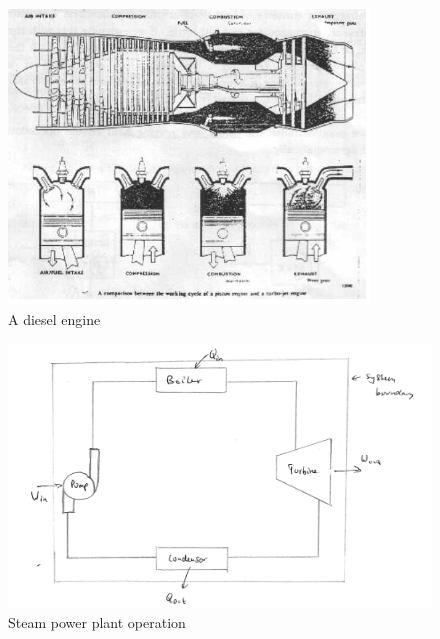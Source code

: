 \documentclass[class=report, crop=false, 12pt,a4paper]{standalone}
\begin{document}
\begin{figure}[H]
  \begin{center}
    \includegraphics[width = \textwidth]{../img/DieselEngine}
    \caption{A diesel engine}
  \end{center}
\end{figure}
\begin{figure}[H]
  \begin{center}
    \includegraphics[width = \textwidth]{../img/SteamPowerPlantDiagram}
    \caption{Steam power plant operation}
  \end{center}
\end{figure}
\end{document}
